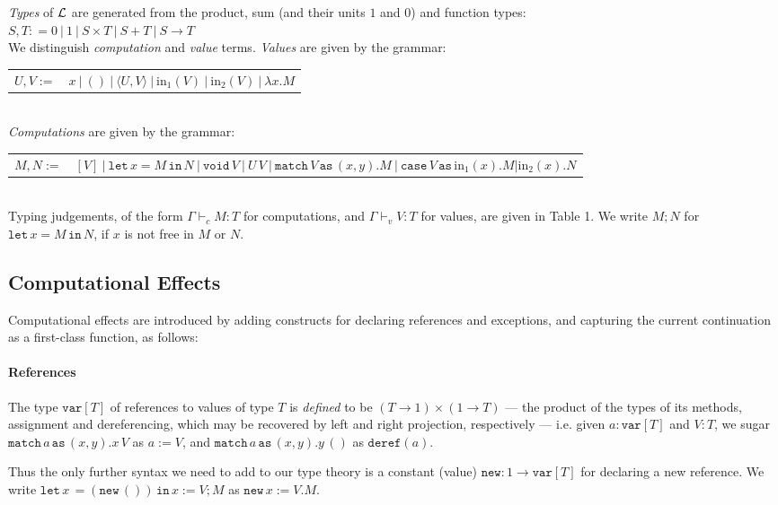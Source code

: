 \documentclass{eptcs}
\def\L{{\cal{L}}}
\newcommand{\cse}{{\mathtt{case}}}
\newcommand{\as}{{\mathtt{as}}}
\newcommand{\void}{{\mathtt{void}}}
\newcommand{\match}{{\mathtt{match}}}
\newcommand{\emp}{{{0}}}
\newcommand{\deref}{{\mathtt{deref}}}
\newcommand{\lett}{{\mathtt{let}}}
\newcommand{\spc}{\hspace{2pt}}
\newcommand{\inj}{\mathrm{in}}
\newcommand{\var}{{\mathtt{var}}}
\newcommand{\new}{{\mathtt{new}}}
\newcommand{\com}{{{1}}}
\newcommand{\inn}{{{\mathtt{in}}}}
\begin{document}
  \emph{Types} of $\L$ are generated  from the product, sum (and their units  $\com$ and $\emp$) and function types:\\
$S,T: = \emp\ |\ \com\ |\ S \times T\ |\  S + T\  |\ S \rightarrow T$\\
We distinguish \emph{computation} and \emph{value} terms.
\emph{Values} are given by the grammar:\\
\begin{tabular}{l l}
$U,V:=$ &$ x\ |\ () \ |\ \langle U,V\rangle\ |\ \inj_1(V)\ |\ \inj_2(V)\ |\  \lambda x.M $\\

\end{tabular}\\ 
\emph{Computations} are given by the grammar:\\
\begin{tabular}{l l}
$M,N:=$ &$ [V]\ |\ \lett\spc x= M\spc \inn \spc N\ |\  \void\spc V\ |\ U\spc V\ |\ \match\spc V \spc \as\spc (x,y). M\ |\  \cse\spc V\spc \as \spc \inj_1(x).M| \inj_2(x).N $\\

\end{tabular}\\
 Typing judgements, of the form $\Gamma \vdash_c M:T$ for computations, and $\Gamma \vdash_v V:T$ for values,  are given in Table 1. We write $M;N$ for $\lett \spc x=M\spc\inn\spc  N$, if $x$ is not free in $M$ or $N$. 

\subsection{Computational Effects}
Computational effects  are introduced by adding constructs for declaring references and exceptions, and capturing the current continuation as a first-class function, as follows: 

\paragraph{References} The type $\var[T]$ of references to values of type $T$ is \emph{defined}  to be $(T \rightarrow \com) \times (\com \rightarrow T)$ --- the product of the types of its methods, assignment and dereferencing, which may be recovered by left and right projection, respectively ---  i.e. given $a:\var[T]$ and $V:T$, we sugar $\match \spc a\spc\as\spc (x,y).x\spc V$ as $a:= V$, and $\match \spc a \spc \as\spc (x,y). y\spc ()$ as $\deref(a)$.

Thus the only further  syntax we need to add to our type theory  is a constant (value) $\new:\com \rightarrow \var[T]$ for declaring a new reference. We write     $\lett\spc x\spc = (\new\spc ()) \spc \inn\spc  x:=V;M$ as $\new\spc x:=V.M$. 
\end{document}

